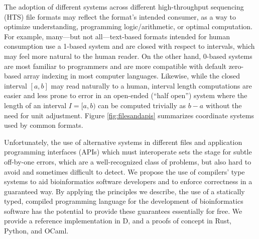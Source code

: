 \documentclass[12pt]{article}
\begin{document}
The adoption of different systems across different high-throughput sequencing (HTS) file formats may reflect the format's intended consumer, as a way to optimize understanding, programming logic/arithmetic, or optimal computation. For example, many---but not all---text-based formats intended for human consumption use a 1-based system and are closed with respect to intervals, which may feel more natural to the human reader. On the other hand, 0-based systems are most familiar to programmers and are more compatible with default zero-based array indexing in most computer languages. Likewise, while the closed interval $[a,b]$ may read naturally to a human, interval length computations are easier and less prone to error in an open-ended (``half open'') system where the length of an interval $I=[a,b)$ can be computed trivially as $b-a$ without the need for unit adjustment. Figure \ref{fig:filesandapis} summarizes coordinate systems used by common formats.

Unfortunately, the use of alternative systems in different files and application programming interfaces (APIs) which must interoperate sets the stage for subtle off-by-one errors, which are a well-recognized class of problems, but also hard to avoid and sometimes difficult to detect.\cite{CWE193} We propose the use of compilers' type systems to aid bioinformatics software developers and to enforce correctness in a guaranteed way. By applying the principles we describe, the use of a statically typed, compiled programming language for the development of bioinformatics software has the potential to provide these guarantees essentially for free. We provide a reference implementation in D, and a proofs of concept in Rust, Python, and OCaml.


\end{document}
